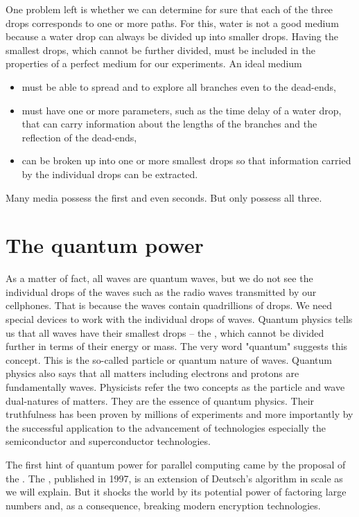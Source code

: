 \documentclass[Letter,11pt]{book}
\begin{document}
One problem left is whether we can determine for sure that each of the three drops corresponds to one or more paths. For this, water is not a good medium because a water drop can always be divided up into smaller drops. Having the smallest drops, which cannot be further divided, must be included in the properties of a perfect medium for our  experiments. An ideal medium
\begin{itemize}
    \item must be able to spread and to explore all branches even to the dead-ends,
    \item must have one or more parameters, such as the time delay of a water drop, that can carry information about the lengths of the branches and the reflection of the dead-ends,
    \item can be broken up into one or more smallest drops so that information carried by the individual drops can be extracted.
\end{itemize}
Many media possess the first and even seconds. But only  possess all three.

\section{The quantum power}
 As a matter of fact, all waves are quantum waves, but we do not see the individual drops of the waves such as the radio waves transmitted by our cellphones. That is because the waves contain quadrillions of drops. We need special devices to work with the individual drops of waves. Quantum physics tells us that all waves have their smallest drops -- the , which cannot be divided further in terms of their energy or mass. The very word "quantum" suggests this concept. This is the so-called particle or quantum nature of waves. Quantum physics also says that all matters including electrons and protons are fundamentally waves. Physicists refer the two concepts as the particle and wave dual-natures of matters. They are the essence of quantum physics. Their truthfulness has been proven by millions of experiments and more importantly by the successful application to the advancement of technologies especially the semiconductor and superconductor technologies.

The first hint of quantum power for parallel computing came by the proposal of the \cite{1985Deutsch}. The , published in 1997, is an extension of Deutsch's algorithm in scale as we will explain. But it shocks the world by its potential power of factoring large numbers and, as a consequence, breaking modern encryption technologies.
\end{document}
